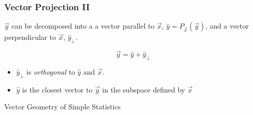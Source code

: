 \documentclass{beamer}
\begin{document}
\begin{frame}
  \frametitle{Vector Projection II}

$\vec{y}$ can be decomposed into a a vector parallel to $\vec{x}$, $\widehat{y} = P_{\vec{x}}(\vec{y})$, and a vector perpendicular to $\vec{x}$, $\widehat{y}_{\bot}$.

\[
\vec{y} = \widehat{y} + \widehat{y}_{\bot} 
\]

\begin{center}

\end{center}

\begin{itemize}
 \item $\widehat{y}_{\bot}$ is \emph{orthogonal} to $\widehat{y}$ and $\vec{x}$.
 \item $\widehat{y}$  is the closest vector to $\vec{y}$ in the subspace defined by $\vec{x}$ 
\end{itemize}

\end{frame}

\begin{frame}
  
\begin{center}
\LARGE{Vector Geometry of Simple Statistics}
\end{center}


\end{frame}
\end{document}
